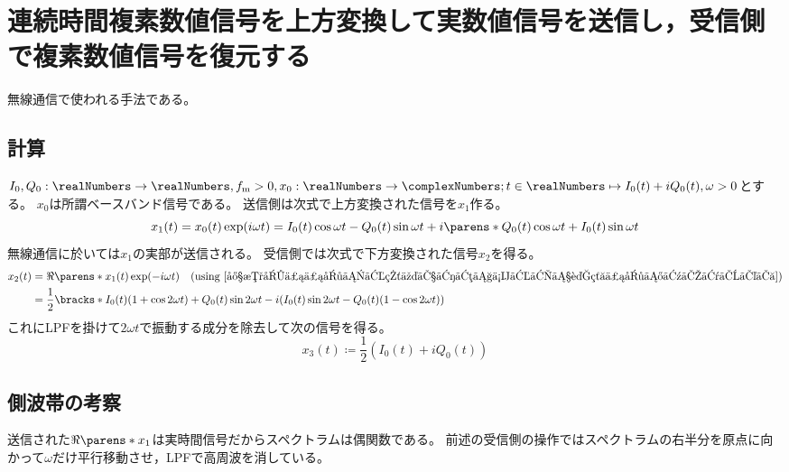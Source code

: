     \section{連続時間複素数値信号を上方変換して実数値信号を送信し，受信側で複素数値信号を復元する}
        無線通信で使われる手法である。
        \subsection{計算}
            $I_0, Q_0:\realNumbers\to\realNumbers,f_\mathrm{m}>0,x_0:\realNumbers\to\complexNumbers; t\in\realNumbers\mapsto I_0(t) + iQ_0(t),\omega > 0$とする。
            $x_0$は所謂ベースバンド信号である。
            送信側は次式で上方変換された信号を$x_1$作る。
            \[ x_1(t) = x_0(t)\exp(i\omega t) = I_0(t)\cos\omega t - Q_0(t)\sin\omega t + i\parens*{Q_0(t)\cos\omega t + I_0(t)\sin\omega t} \]
            無線通信に於いては$x_1$の実部が送信される。
            受信側では次式で下方変換された信号$x_2$を得る。
            \begin{align*}
                x_2(t) &= \Re\parens*{x_1(t)}\exp(-i\omega t)\quad(\text{using }\ref{実数受信信号から直交ミキサで作られた複素信号のスペクトラム})\\
                &= \frac{1}{2}\bracks*{I_0(t)(1+\cos 2\omega t) + Q_0(t)\sin 2\omega t - i(I_0(t)\sin 2\omega t - Q_0(t)(1-\cos 2\omega t))}
            \end{align*}
            これにLPFを掛けて$2\omega t$で振動する成分を除去して次の信号を得る。
            \[ x_3(t) \coloneq \frac{1}{2}(I_0(t) + iQ_0(t)) \]
        \subsection{側波帯の考察}
            送信された$\Re\parens*{x_1}$は実時間信号だからスペクトラムは偶関数である。
            前述の受信側の操作ではスペクトラムの右半分を原点に向かって$\omega$だけ平行移動させ，LPFで高周波を消している。